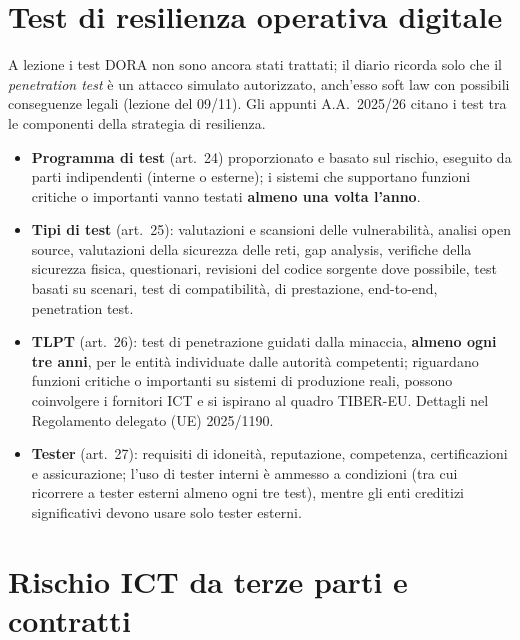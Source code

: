 \section{Test di resilienza operativa digitale}
\label{sec:dora-test}

A lezione i test DORA non sono ancora stati trattati; il diario ricorda solo che il
\emph{penetration test} è un attacco simulato autorizzato, anch'esso soft law con possibili
conseguenze legali (lezione del 09/11). Gli appunti A.A.~2025/26 citano i test tra le componenti della
strategia di resilienza.

\begin{integrazione}[artt.~24--27]
\begin{itemize}
  \item \textbf{Programma di test} (art.~24) proporzionato e basato sul rischio, eseguito da parti
    indipendenti (interne o esterne); i sistemi che supportano funzioni critiche o importanti vanno
    testati \textbf{almeno una volta l'anno}.
  \item \textbf{Tipi di test} (art.~25): valutazioni e scansioni delle vulnerabilità, analisi open
    source, valutazioni della sicurezza delle reti, gap analysis, verifiche della sicurezza fisica,
    questionari, revisioni del codice sorgente dove possibile, test basati su scenari, test di
    compatibilità, di prestazione, end-to-end, penetration test.
  \item \textbf{TLPT} (art.~26): test di penetrazione guidati dalla minaccia, \textbf{almeno ogni tre
    anni}, per le entità individuate dalle autorità competenti; riguardano funzioni critiche o
    importanti su sistemi di produzione reali, possono coinvolgere i fornitori ICT e si ispirano al
    quadro TIBER-EU. Dettagli nel Regolamento delegato (UE) 2025/1190.
  \item \textbf{Tester} (art.~27): requisiti di idoneità, reputazione, competenza, certificazioni e
    assicurazione; l'uso di tester interni è ammesso a condizioni (tra cui ricorrere a tester esterni
    almeno ogni tre test), mentre gli enti creditizi significativi devono usare solo tester esterni.
\end{itemize}
\end{integrazione}

\section{Rischio ICT da terze parti e contratti}
\label{sec:dora-terze-parti}

